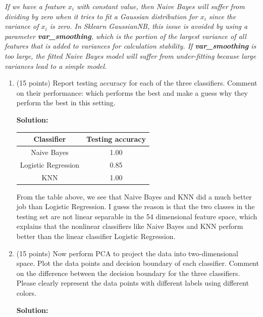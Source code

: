 \documentclass[twoside,10pt]{article}
\begin{document}
\begin{enumerate}
\textit{{\color{red} If we have a feature $x_i$ with constant value, then Naive Bayes will suffer from dividing by zero when it tries to fit a Gaussian distribution for $x_i$ since the variance of $x_i$ is zero. In Sklearn GaussianNB, this issue is avoided by using a parameter \textbf{var\_smoothing}, which is the portion of the largest variance of all features that is added to variances for calculation stability. If \textbf{var\_smoothing} is too large, the fitted Naive Bayes model will suffer from under-fitting because large variances lead to a simple model.  }}

\begin{enumerate}

	\item (15 points) Report testing accuracy for each of the three classifiers.  Comment on their performance: which performs the best and make a guess why they perform the best in this setting. 
	\begin{tcolorbox}
	\textbf{Solution:} \\
	\begin{center}
	\begin{tabular}{| c | c |}%
	\hline
	Classifier & Testing accuracy \\
	\hline
        Naive Bayes & 1.00 \\%
        \hline
        Logistic Regression &0.85\\%
        \hline
        KNN & 1.00\\
        \hline
        \end{tabular}
        \end{center}
        From the table above, we see that Naive Bayes and KNN did a much better job than Logistic Regression. I guess the reason is that the two classes in the testing set are not linear separable in the 54 dimensional feature space, which explains that the nonlinear classifiers like Naive Bayes and KNN perform better than the linear classifier Logistic Regression.
	\end{tcolorbox}
	\item (15 points) Now perform PCA to project the data into two-dimensional space. Plot the data points and decision boundary of each classifier. Comment on the difference between the decision boundary for the three classifiers. Please clearly represent the data points with different labels using different colors.
\begin{tcolorbox}
\textbf{Solution:}\\


\end{tcolorbox}
\end{enumerate}
\end{enumerate}
\end{document}
